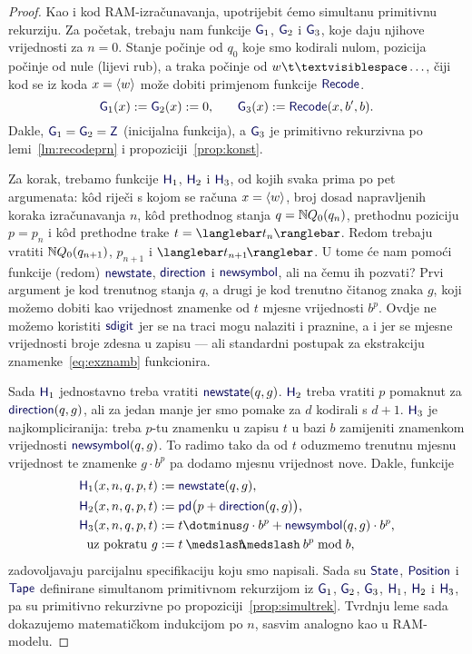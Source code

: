 \begin{proof}
Kao i kod RAM-izračunavanja, upotrijebit ćemo simultanu primitivnu rekurziju. Za početak, trebaju nam funkcije $\f G_1$, $\f G_2$ i $\f G_3$, koje daju njihove vrijednosti za $n=0$. Stanje počinje od $q_0$ koje smo kodirali nulom, pozicija počinje od nule (lijevi rub), a traka počinje od $w\bl\ldots$, čiji kod se iz koda $x=\langle w\rangle$ može dobiti primjenom funkcije $\f{Recode}$.
\begin{equation}
    \f G_1(x):=\f G_2(x):=0\text,\qquad
    \f G_3(x):=\f{Recode}(x,b',b)\text.
\end{equation}
Dakle, $\f G_1=\f G_2=\f Z$ (inicijalna funkcija), a $\f G_3$ je primitivno rekurzivna po lemi~\ref{lm:recodeprn} i propoziciji~\ref{prop:konst}.

	Za korak, trebamo funkcije $\f H_1$, $\f H_2$ i $\f H_3$, od kojih svaka prima po pet argumenata: k\^od riječi s kojom se računa $x=\langle w\rangle$, broj dosad napravljenih koraka izračunavanja $n$, k\^od prethodnog stanja $q={\mathbb N} Q_0(q_n)$, prethodnu poziciju $p=p_n$ i k\^od prethodne trake $t=\knk{t_n}$. Redom trebaju vratiti ${\mathbb N} Q_0(q_{n+1})$, $p_{n+1}$ i $\knk{t_{n+1}\mspace{-2mu}}$. U tome će nam pomoći funkcije (redom) $\f{newstate}$, $\f{direction}$ i $\f{newsymbol}$, ali na čemu ih pozvati? Prvi argument je kod trenutnog stanja $q$, a drugi je kod trenutno čitanog znaka $g$, koji možemo dobiti kao vrijednost znamenke od $t$ mjesne vrijednosti $b^p$. Ovdje ne možemo koristiti $\f{sdigit}$ jer se na traci mogu nalaziti i praznine, a i jer se mjesne vrijednosti broje zdesna u zapisu --- ali standardni postupak za ekstrakciju znamenke~\eqref{eq:exznamb} funkcionira.

Sada $\f H_1$ jednostavno treba vratiti $\f{newstate}(q,g)$. $\f H_2$ treba vratiti $p$ pomaknut za $\f{direction}(q,g)$, ali za jedan manje jer smo pomake za $d$ kodirali s $d+1$. $\f H_3$ je najkompliciranija: treba $p$-tu znamenku u zapisu $t$ u bazi $b$ zamijeniti znamenkom vrijednosti $\f{newsymbol}(q,g)$. To radimo tako da od $t$ oduzmemo trenutnu mjesnu vrijednost te znamenke $g\cdot b^p$ pa dodamo mjesnu vrijednost nove. Dakle, funkcije
\begin{align}
    \f H_1(x,n,q,p,t)&:=\f{newstate}(q,g)\text,\\
    \f H_2(x,n,q,p,t)&:=\f{pd}\bigl(p+\f{direction}(q,g)\bigr)\text,\\
    \f H_3(x,n,q,p,t)&:=t\dotminus g\cdot b^p+\f{newsymbol}(q,g)\cdot b^p\text,\\
    \label{eq:exznamb}\text{uz pokratu }g&:=t\div b^p\bmod b\text,
\end{align}
zadovoljavaju parcijalnu specifikaciju koju smo napisali. Sada su $\f{State}$, $\f{Position}$ i $\f{Tape}$ definirane simultanom primitivnom rekurzijom iz $\f G_1$, $\f G_2$, $\f G_3$, $\f H_1$, $\f H_2$ i $\f H_3$, pa su primitivno rekurzivne po propoziciji~\ref{prop:simultrek}. Tvrdnju leme sada dokazujemo matematičkom indukcijom po $n$, sasvim analogno kao u RAM-modelu.


\end{proof}
